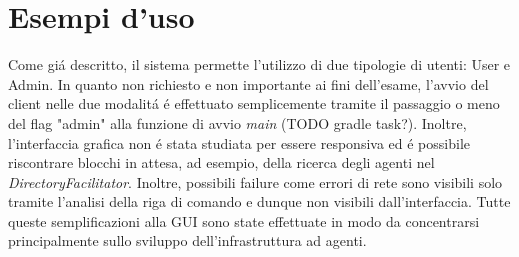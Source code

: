 \section{Esempi d’uso}



Come gi\'a descritto, il sistema permette l'utilizzo di due tipologie di utenti: User e Admin. In quanto non richiesto e non importante ai fini dell'esame, l'avvio del client nelle due modalit\'a \'e effettuato semplicemente tramite il passaggio o meno del flag "admin" alla funzione di avvio \textit{main} (TODO gradle task?). Inoltre, l'interfaccia grafica non \'e stata studiata per essere responsiva ed \'e possibile riscontrare blocchi in attesa, ad esempio, della ricerca degli agenti nel \textit{DirectoryFacilitator}. Inoltre, possibili failure come errori di rete sono visibili solo tramite l'analisi della riga di comando e dunque non visibili dall'interfaccia. Tutte queste semplificazioni alla GUI sono state effettuate in modo da concentrarsi principalmente sullo sviluppo dell'infrastruttura ad agenti.

